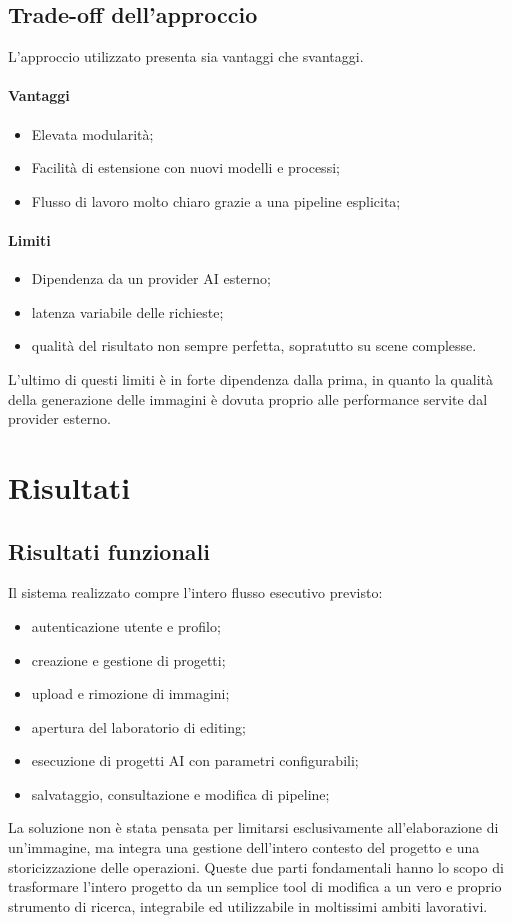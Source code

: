 \documentclass[oneside]{supsistudent}
\begin{document}
\section{Trade-off dell'approccio}
L'approccio utilizzato presenta sia vantaggi che svantaggi.

\subsubsection{Vantaggi}
\begin{itemize}
  \item Elevata modularità;
  \item Facilità di estensione con nuovi modelli e processi;
  \item Flusso di lavoro molto chiaro grazie a una pipeline esplicita;
\end{itemize}

\subsubsection{Limiti}
\begin{itemize}
  \item Dipendenza da un provider AI esterno;
  \item latenza variabile delle richieste;
  \item qualità del risultato non sempre perfetta, sopratutto su scene complesse.
\end{itemize}
L'ultimo di questi limiti è in forte dipendenza dalla prima, in quanto la qualità della generazione delle immagini
è dovuta proprio alle performance servite dal provider esterno.






\chapter{Risultati}

\section{Risultati funzionali}
Il sistema realizzato compre l'intero flusso esecutivo previsto:
\begin{itemize}
  \item autenticazione utente e profilo;
  \item creazione e gestione di progetti;
  \item upload e rimozione di immagini;
  \item apertura del laboratorio di editing;
  \item esecuzione di progetti AI con parametri configurabili;
  \item salvataggio, consultazione e modifica di pipeline;
\end{itemize}
La soluzione non è stata pensata per limitarsi esclusivamente all'elaborazione di un'immagine, ma
integra una gestione dell'intero contesto del progetto e una storicizzazione delle operazioni. Queste
due parti fondamentali hanno lo scopo di trasformare l'intero progetto da un semplice tool di modifica
a un vero e proprio strumento di ricerca, integrabile ed utilizzabile in moltissimi ambiti lavorativi.
\end{document}
